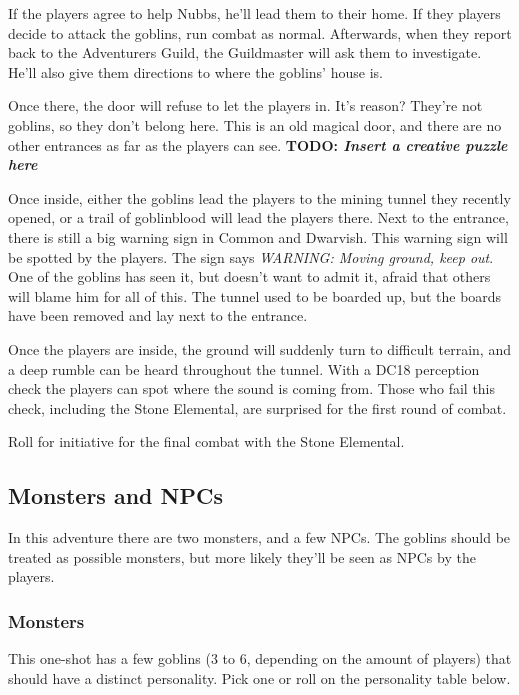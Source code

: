 \documentclass[10pt,twoside,twocolumn,openany,nodeprecatedcode,a4paper,bg=none]{dndbook}
\begin{document}
If the players agree to help Nubbs, he'll lead them to their home. 
If they players decide to attack the goblins, run combat as normal. Afterwards,
when they report back to the Adventurers Guild, the Guildmaster will ask them
to investigate. He'll also give them directions to where the goblins' house is.

Once there, the door will refuse to let the players in. It's reason? They're
not goblins, so they don't belong here. This is an old magical door, and there
are no other entrances as far as the players can see.
\textbf{TODO: \textit{Insert a creative puzzle here}}

Once inside, either the goblins lead the players to the mining tunnel they 
recently opened, or a trail of goblinblood will lead the players there. Next
to the entrance, there is still a big warning sign in Common and Dwarvish. This
warning sign will be spotted by the players. The sign says \textit{WARNING: 
Moving ground, keep out}. One of the goblins has seen it, but doesn't want to
admit it, afraid that others will blame him for all of this. The tunnel used to
be boarded up, but the boards have been removed and lay next to the entrance.

Once the players are inside, the ground will suddenly turn to difficult
terrain, and a deep rumble can be heard throughout the tunnel. With a DC18
perception check the players can spot where the sound is coming from. Those
who fail this check, including the Stone Elemental, are surprised for the first
round of combat.

Roll for initiative for the final combat with the Stone Elemental. 

\subsection{Monsters and NPCs}
In this adventure there are two monsters, and a few NPCs. The goblins should be
treated as possible monsters, but more likely they'll be seen as NPCs by the
players.

\subsubsection{Monsters}
This one-shot has a few goblins (3 to 6, depending on the amount of players)
that should have a distinct personality. Pick one or roll on the personality
table below.





\end{document}
